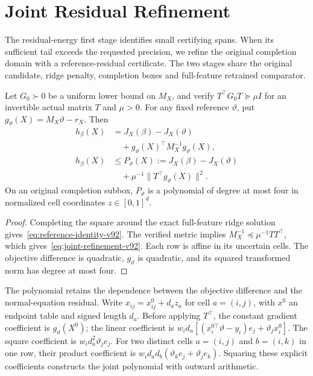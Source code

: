 \section{Joint Residual Refinement}\label{app:joint-refinement-v92}
The residual-energy first stage identifies small certifying spans. When its sufficient tail exceeds the requested precision, we refine the original completion domain with a reference-residual certificate. The two stages share the original candidate, ridge penalty, completion boxes and full-feature retrained comparator.

\begin{proposition}\label{prop:joint-refinement-v92}
Let $G_0\succ0$ be a uniform lower bound on $M_X$, and verify $T^\top G_0T\succeq\mu I$ for an invertible actual matrix $T$ and $\mu>0$. For any fixed reference $\vartheta$, put $g_\vartheta(X)=M_X\vartheta-r_X$. Then
\begin{align}
h_\beta(X)&=J_X(\beta)-J_X(\vartheta)\nonumber\\
 &\quad+g_\vartheta(X)^\top M_X^{-1}g_\vartheta(X),\label{eq:reference-identity-v92}\\
h_\beta(X)&\le P_\vartheta(X):=J_X(\beta)-J_X(\vartheta)\nonumber\\
 &\quad+\mu^{-1}\|T^\top g_\vartheta(X)\|^2.\label{eq:joint-refinement-v92}
\end{align}
On an original completion subbox, $P_\vartheta$ is a polynomial of degree at most four in normalized cell coordinates $z\in[0,1]^d$.
\end{proposition}
\begin{proof}
Completing the square around the exact full-feature ridge solution gives~\eqref{eq:reference-identity-v92}. The verified metric implies $M_X^{-1}\preceq\mu^{-1}TT^\top$, which gives~\eqref{eq:joint-refinement-v92}. Each row is affine in its uncertain cells. The objective difference is quadratic, $g_\vartheta$ is quadratic, and its squared transformed norm has degree at most four.
\end{proof}

The polynomial retains the dependence between the objective difference and the normal-equation residual. Write $x_{ij}=x^0_{ij}+d_a z_a$ for cell $a=(i,j)$, with $x^0$ an endpoint table and signed length $d_a$. Before applying $T^\top$, the constant gradient coefficient is $g_\vartheta(X^0)$; the linear coefficient is $w_i d_a[(x_i^{0\top}\vartheta-y_i)e_j+\vartheta_j x_i^0]$. The square coefficient is $w_i d_a^2\vartheta_j e_j$. For two distinct cells $a=(i,j)$ and $b=(i,k)$ in one row, their product coefficient is $w_i d_a d_b(\vartheta_k e_j+\vartheta_j e_k)$. Squaring these explicit coefficients constructs the joint polynomial with outward arithmetic.

